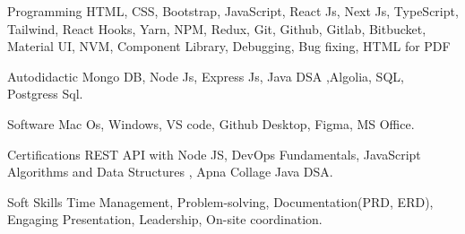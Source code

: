 
\begin{cvskills}

  \cvskill
    { Programming} %
    { HTML, CSS, Bootstrap, JavaScript, React Js, Next Js, TypeScript, Tailwind, React Hooks, Yarn, NPM, Redux, Git, Github, Gitlab, Bitbucket, Material UI, NVM, Component Library, Debugging, Bug fixing, HTML for PDF  }

  \cvskill
    { Autodidactic } %
    { Mongo DB, Node Js, Express Js, Java DSA ,Algolia, SQL, Postgress Sql. }

  \cvskill
    { Software} %
    {Mac Os, Windows, VS code, Github Desktop, Figma, MS Office.}

  \cvskill
    { Certifications} %
    { REST API with Node JS, DevOps Fundamentals, JavaScript Algorithms and Data Structures , Apna Collage Java DSA. }

  \cvskill
    {Soft Skills} %
    {Time Management, Problem-solving, Documentation(PRD, ERD), Engaging Presentation, Leadership, On-site coordination.} %

\end{cvskills}
